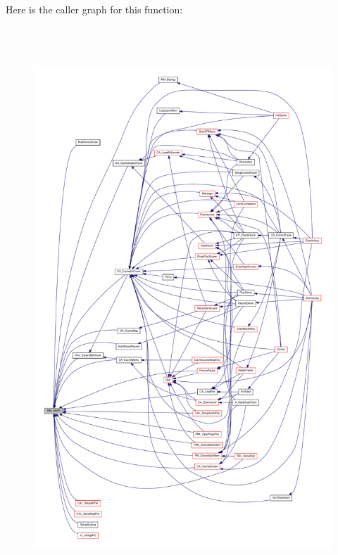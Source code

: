 Here is the caller graph for this function:
\nopagebreak
\begin{figure}[H]
\begin{center}
\leavevmode
\includegraphics[height=600pt]{ID__MM_8C_ab70f353278bae916507eb350c39f4ebb_icgraph}
\end{center}
\end{figure}


